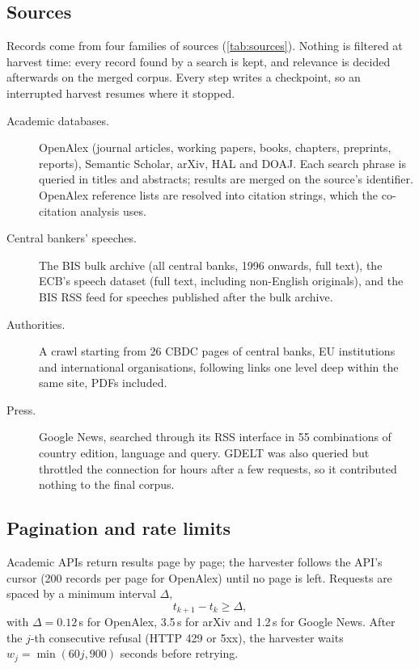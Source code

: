 \documentclass[11pt,a4paper]{article}
\begin{document}
\subsection{Sources}
Records come from four families of sources (\cref{tab:sources}). Nothing is filtered at harvest time: every record found by a search is kept, and relevance is decided afterwards on the merged corpus. Every step writes a checkpoint, so an interrupted harvest resumes where it stopped.

\begin{description}
\item[Academic databases.] OpenAlex (journal articles, working papers, books, chapters, preprints, reports), Semantic Scholar, arXiv, HAL and DOAJ. Each search phrase is queried in titles and abstracts; results are merged on the source's identifier. OpenAlex reference lists are resolved into citation strings, which the co-citation analysis uses.
\item[Central bankers' speeches.] The BIS bulk archive (all central banks, 1996 onwards, full text), the ECB's speech dataset (full text, including non-English originals), and the BIS RSS feed for speeches published after the bulk archive.
\item[Authorities.] A crawl starting from 26 CBDC pages of central banks, EU institutions and international organisations, following links one level deep within the same site, PDFs included.
\item[Press.] Google News, searched through its RSS interface in 55 combinations of country edition, language and query. GDELT was also queried but throttled the connection for hours after a few requests, so it contributed nothing to the final corpus.
\end{description}



\subsection{Pagination and rate limits}
Academic APIs return results page by page; the harvester follows the API's cursor (200 records per page for OpenAlex) until no page is left. Requests are spaced by a minimum interval $\Delta$,
\[ t_{k+1} - t_k \ge \Delta, \]
with $\Delta = 0.12$\,s for OpenAlex, 3.5\,s for arXiv and 1.2\,s for Google News. After the $j$-th consecutive refusal (HTTP 429 or 5xx), the harvester waits $w_j = \min(60j, 900)$ seconds before retrying.
\end{document}
